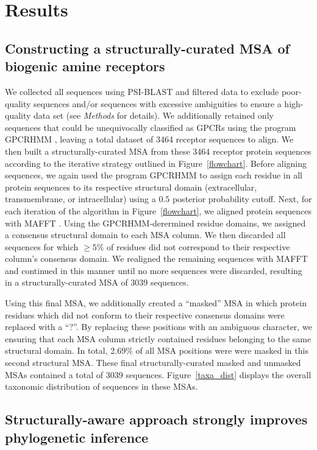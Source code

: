 \documentclass[fleqn,10pt]{wlpeerj}
\begin{document}
\section*{Results}

\subsection*{Constructing a structurally-curated MSA of biogenic amine receptors}
We collected all sequences using PSI-BLAST and filtered data to exclude poor-quality sequences and/or sequences with excessive ambiguities to ensure a high-quality data set (see \emph{Methods} for details). We additionally retained only sequences that could be unequivocally classified as GPCRs using the program GPCRHMM \citep{Wistrand2006}, leaving a total dataset of 3464 receptor sequences to align. We then built a structurally-curated MSA from these 3464 receptor protein sequences according to the iterative strategy outlined in Figure~\ref{flowchart}. Before aligning sequences, we again used the program GPCRHMM \citep{Wistrand2006} to assign each residue in all protein sequences to its respective structural domain (extracellular, transmembrane, or intracellular) using a $0.5$ posterior probability cutoff. Next, for each iteration of the algorithm in Figure~\ref{flowchart}, we aligned protein sequences with MAFFT \citep{mafftv7}. Using the GPCRHMM-derermined residue domains, we assigned a consensus structural domain to each MSA column. We then discarded all sequences for which $\geq 5\%$ of residues did not correspond to their respective column's consensus domain. We realigned the remaining sequences with MAFFT and continued in this manner until no more sequences were discarded, resulting in a structurally-curated MSA of 3039 sequences.

Using this final MSA, we additionally created a ``masked'' MSA in which protein residues which did not conform to their respective consensus domains were replaced with a ``?''. By replacing these positions with an ambiguous character, we ensuring that each MSA column strictly contained residues belonging to the same structural domain. In total, 2.69\% of all MSA positions were were masked in this second structural MSA. These final structurally-curated masked and unmasked MSAs contained a total of 3039 sequences. Figure~\ref{taxa_dist} displays the overall taxonomic distribution of sequences in these MSAs. 


\subsection*{Structurally-aware approach strongly improves phylogenetic inference}
\end{document}
